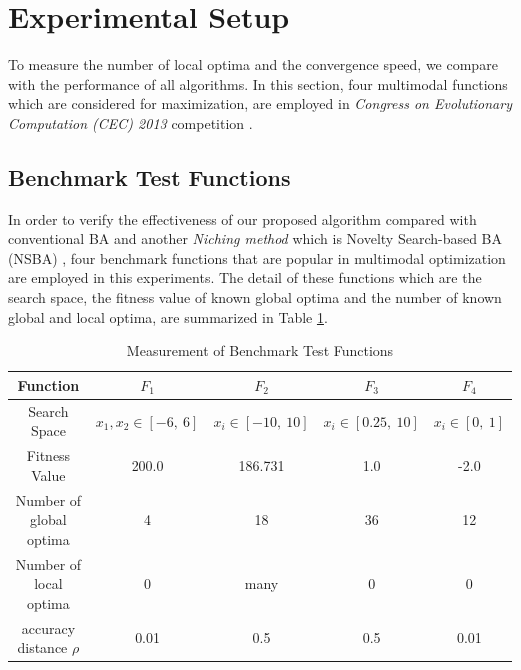 \documentclass[conference]{IEEEtran}
\begin{document}
\section{Experimental Setup}
To measure the number of local optima and the convergence speed, we compare with the performance of all algorithms. In this section, four multimodal functions which are considered for maximization, are employed in \textit{Congress on Evolutionary Computation (CEC) 2013} competition \cite{cec2013}. 

\subsection{Benchmark Test Functions}
In order to verify the effectiveness of our proposed algorithm compared with conventional BA and another {\it Niching method} which is Novelty Search-based BA (NSBA) \cite{NSBA}, four benchmark functions that are popular in multimodal optimization are employed in this experiments. The detail of these functions which are the search space, the fitness value of known global optima and the number of known global and local optima, are summarized in Table \ref{tab1}.


\begin{table}[h]
\caption{Measurement of Benchmark Test Functions}
\begin{center}
\begin{tabular}{c|c|c|c|c}
\hline
Function & ${F_1}$ & ${F_2}$ & ${F_3}$ & ${F_4}$ \\
\hline
Search Space & $x_1, x_2 \in [-6, \ 6]$ & $x_i \in [-10, \ 10]$ & $x_i \in [0.25, \ 10]$ & $x_i \in [0, \ 1]$\\
\hline
Fitness Value & 200.0 & 186.731 & 1.0 & -2.0   \\
\hline
Number of global optima & 4 & 18 & 36 & 12 \\
\hline
Number of local optima &  0 & many & 0 & 0  \\
\hline
accuracy distance $\rho$ & 0.01 & 0.5 & 0.5 & 0.01 \\
\hline
\end{tabular}
\label{tab1}
\end{center}
\end{table}
\end{document}
